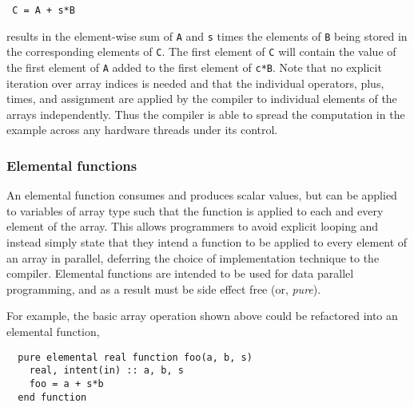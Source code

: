 {\small
\begin{verbatim}
 C = A + s*B
\end{verbatim}
}

results in the element-wise sum of {\tt A} and {\tt s} times the elements of
{\tt B} being stored in the corresponding elements of {\tt C}. The first
element of {\tt C} will contain the value of the first element of {\tt A}
added to the first element of {\tt c*B}.  Note that no explicit iteration over
array indices is needed and that the individual operators, plus, times, and
assignment are applied by the compiler to individual elements of the arrays
independently.  Thus the compiler is able to spread the computation in the
example across any hardware threads under its control.


\subsubsection*{Elemental functions}

An elemental function consumes and produces scalar values, but can be applied
to variables of array type such that the function is applied to each and every
element of the array.  This allows programmers to avoid explicit looping and
instead simply state that they intend a function to be applied to every
element of an array in parallel, deferring the choice of implementation
technique to the compiler.  Elemental functions are intended to be used for
data parallel programming, and as a result must be side effect free (or,
\emph{pure}).


For example, the basic array operation shown above could be refactored into
an elemental function,

{\small
\begin{verbatim}
  pure elemental real function foo(a, b, s)
    real, intent(in) :: a, b, s
    foo = a + s*b
  end function
\end{verbatim}
}

